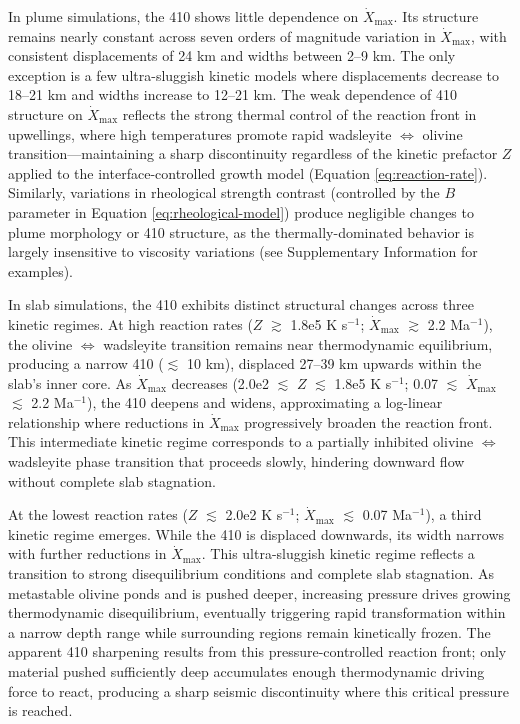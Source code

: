\documentclass[
  paper=a4,
  ,captions=tableheading
]{scrartcl}
\begin{document}
In plume simulations, the 410 shows little dependence on
\(\dot{X}_{\mathrm{max}}\). Its structure remains nearly constant across
seven orders of magnitude variation in \(\dot{X}_{\mathrm{max}}\), with
consistent displacements of 24 km and widths between 2--9 km. The only
exception is a few ultra-sluggish kinetic models where displacements
decrease to 18--21 km and widths increase to 12--21 km. The weak
dependence of 410 structure on \(\dot{X}_{\mathrm{max}}\) reflects the
strong thermal control of the reaction front in upwellings, where high
temperatures promote rapid wadsleyite \(\Leftrightarrow\) olivine
transition---maintaining a sharp discontinuity regardless of the kinetic
prefactor \(Z\) applied to the interface-controlled growth model
(Equation \ref{eq:reaction-rate}). Similarly, variations in rheological
strength contrast (controlled by the \(B\) parameter in Equation
\ref{eq:rheological-model}) produce negligible changes to plume
morphology or 410 structure, as the thermally-dominated behavior is
largely insensitive to viscosity variations (see Supplementary
Information for examples).

In slab simulations, the 410 exhibits distinct structural changes across
three kinetic regimes. At high reaction rates (\(Z\) \(\gtrsim\) 1.8e5 K
s\(^{-1}\); \(\dot{X}_{\mathrm{max}}\) \(\gtrsim\) 2.2 Ma\(^{-1}\)), the
olivine \(\Leftrightarrow\) wadsleyite transition remains near
thermodynamic equilibrium, producing a narrow 410 (\(\lesssim\) 10 km),
displaced 27--39 km upwards within the slab's inner core. As
\(\dot{X}_{\mathrm{max}}\) decreases (2.0e2 \(\lesssim\) \(Z\)
\(\lesssim\) 1.8e5 K s\(^{-1}\); 0.07 \(\lesssim\)
\(\dot{X}_{\mathrm{max}}\) \(\lesssim\) 2.2 Ma\(^{-1}\)), the 410
deepens and widens, approximating a log-linear relationship where
reductions in \(\dot{X}_{\mathrm{max}}\) progressively broaden the
reaction front. This intermediate kinetic regime corresponds to a
partially inhibited olivine \(\Leftrightarrow\) wadsleyite phase
transition that proceeds slowly, hindering downward flow without
complete slab stagnation.

At the lowest reaction rates (\(Z\) \(\lesssim\) 2.0e2 K s\(^{-1}\);
\(\dot{X}_{\mathrm{max}}\) \(\lesssim\) 0.07 Ma\(^{-1}\)), a third
kinetic regime emerges. While the 410 is displaced downwards, its width
narrows with further reductions in \(\dot{X}_{\mathrm{max}}\). This
ultra-sluggish kinetic regime reflects a transition to strong
disequilibrium conditions and complete slab stagnation. As metastable
olivine ponds and is pushed deeper, increasing pressure drives growing
thermodynamic disequilibrium, eventually triggering rapid transformation
within a narrow depth range while surrounding regions remain kinetically
frozen. The apparent 410 sharpening results from this
pressure-controlled reaction front; only material pushed sufficiently
deep accumulates enough thermodynamic driving force to react, producing
a sharp seismic discontinuity where this critical pressure is reached.
\end{document}
